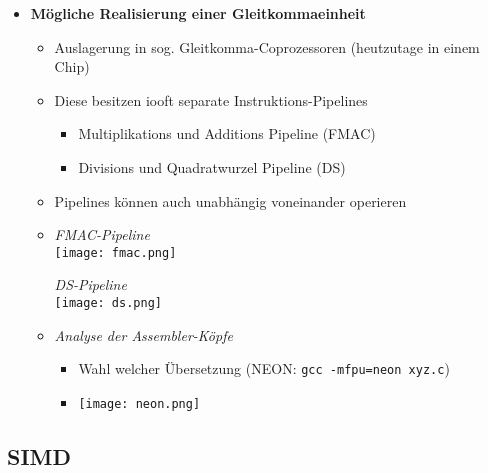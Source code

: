\begin{itemize}
        \item \textbf{Mögliche Realisierung einer Gleitkommaeinheit}
            \begin{itemize}
                \item Auslagerung in sog. Gleitkomma-Coprozessoren (heutzutage in einem Chip)
                \item Diese besitzen iooft separate Instruktions-Pipelines 
                    \begin{itemize}
                        \item Multiplikations und Additions Pipeline (FMAC)
                        \item Divisions und Quadratwurzel Pipeline (DS)
                    \end{itemize}
                \item Pipelines können auch unabhängig voneinander operieren
                \item[]
                    \begin{minipage}{0.45\textwidth}
                        \textit{FMAC-Pipeline} \\
                        \texttt{[image: fmac.png]}
                    \end{minipage}
                    \begin{minipage}{0.45\textwidth}
                        \textit{DS-Pipeline} \\
                        \texttt{[image: ds.png]}
                    \end{minipage}
                \item \textit{Analyse der Assembler-Köpfe}
                    \begin{itemize}
                        \item Wahl welcher Übersetzung (NEON: \texttt{gcc -mfpu=neon xyz.c})
                        \item[] \texttt{[image: neon.png]}
                    \end{itemize}
            \end{itemize}

    \end{itemize}

\subsection{SIMD}

